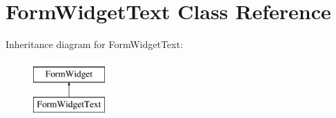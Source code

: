 \hypertarget{class_form_widget_text}{}\section{Form\+Widget\+Text Class Reference}
\label{class_form_widget_text}
Inheritance diagram for Form\+Widget\+Text\+:\begin{figure}[H]
\begin{center}
\leavevmode
\includegraphics[height=2.000000cm]{class_form_widget_text}
\end{center}
\end{figure}
